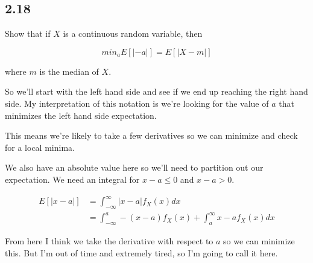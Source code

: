 \subsection*{2.18}

Show that if $X$ is a continuous random variable, then 

\[
	min_a E[|-a|] = E[|X-m|]
\]

where $m$ is the median of $X$.

So we'll start with the left hand side and see if we end up reaching the right hand side. My interpretation of this notation is we're looking for the value of $a$ that minimizes the left hand side expectation. 

This means we're likely to take a few derivatives so we can minimize and check for a local minima. 

We also have an absolute value here so we'll need to partition out our expectation. We need an integral for $x-a \leq 0$ and $x-a > 0$. 

\begin{align*}
	E[|x-a|] &= \int_{-\infty}^{\infty} |x-a| f_X(x) dx \\
	&= \int_{-\infty}^{a} -(x-a) f_X(x) + \int_{a}^{\infty} x - a f_X(x) dx
\end{align*}

From here I think we take the derivative with respect to $a$ so we can minimize this. But I'm out of time and extremely tired, so I'm going to call it here.
